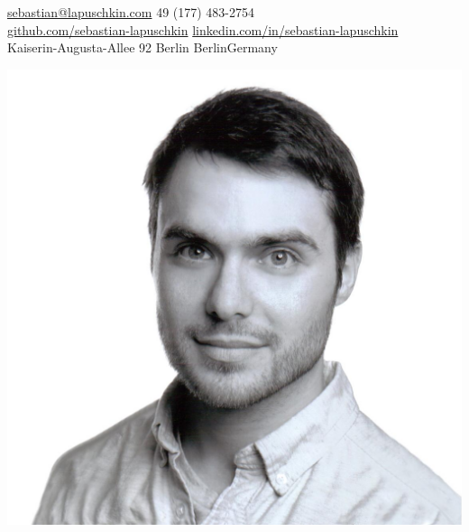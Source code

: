 \documentclass[10pt,a4paper]{article} %
\begin{document}

\noindent
\begin{minipage}{.8\textwidth}


\noindent\href{mailto:sebastian@lapuschkin.com}{sebastian@lapuschkin.com}\bull %
\textsmaller{+}49 (177) 483-2754 %
\\
\href{https://github.com/sebastian-lapuschkin}{github.com/sebastian-lapuschkin}\bull %
\href{https://www.linkedin.com/in/sebastian-lapuschkin}{linkedin.com/in/sebastian-lapuschkin} %
\\
Kaiserin-Augusta-Allee 92 Berlin \bull Berlin\bull Germany %
\end{minipage}
\begin{minipage}{.2\textwidth}
\includegraphics[width=\textwidth]{resources/mug.jpg}
\end{minipage}
\end{document}
